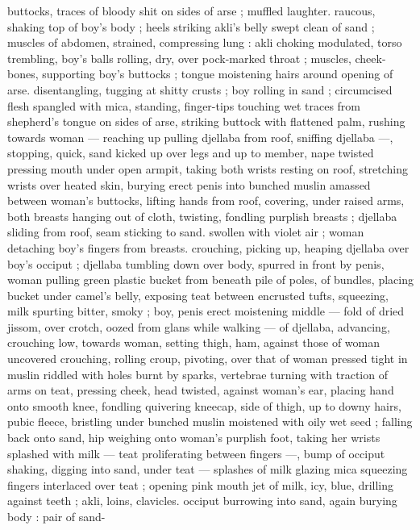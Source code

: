 buttocks, traces of bloody shit on sides of arse ; muffled laughter. 
raucous, shaking top of boy's body ; heels striking akli's belly swept 
clean of sand ; muscles of abdomen, strained, compressing lung : 
akli choking modulated, torso trembling, boy's balls rolling, dry, over 
pock-marked throat ; muscles, cheek-bones, supporting boy's 
buttocks ; tongue moistening hairs around opening of arse. 
disentangling, tugging at shitty crusts ; boy rolling in sand ; 
circumcised flesh spangled with mica, standing, finger-tips touching 
wet traces from shepherd's tongue on sides of arse, striking buttock 
with flattened palm, rushing towards woman --- reaching up pulling 
djellaba from roof, sniffing djellaba ---, stopping, quick, sand kicked 
up over legs and up to member, nape twisted pressing mouth under 
open armpit, taking both wrists resting on roof, stretching wrists over 
heated skin, burying erect penis into bunched muslin amassed 
between woman's buttocks, lifting hands from roof, covering, under 
raised arms, both breasts hanging out of cloth, twisting, fondling 
purplish breasts ; djellaba sliding from roof, seam sticking to sand. 
swollen with violet air ; woman detaching boy's fingers from breasts. 
crouching, picking up, heaping djellaba over boy's occiput ; djellaba 
tumbling down over body, spurred in front by penis, woman pulling 
green plastic bucket from beneath pile of poles, of bundles, placing 
bucket under camel's belly, exposing teat between encrusted tufts, 
squeezing, milk spurting bitter, smoky ; boy, penis erect moistening 
middle --- fold of dried jissom, over crotch, oozed from glans while 
walking --- of djellaba, advancing, crouching low, towards woman, 
setting thigh, ham, against those of woman uncovered crouching, 
rolling croup, pivoting, over that of woman pressed tight in muslin 
riddled with holes burnt by sparks, vertebrae turning with traction of 
arms on teat, pressing cheek, head twisted, against woman's ear, 
placing hand onto smooth knee, fondling quivering kneecap, side of 
thigh, up to downy hairs, pubic fleece, bristling under bunched 
muslin moistened with oily wet seed ; falling back onto sand, hip 
weighing onto woman's purplish foot, taking her wrists splashed with 
milk --- teat proliferating between fingers ---, bump of occiput 
shaking, digging into sand, under teat --- splashes of milk glazing 
mica {\dashcom} squeezing fingers interlaced over teat ; opening pink mouth 
{\col} jet of milk, icy, blue, drilling against teeth ; akli, loins, clavicles. 
occiput burrowing into sand, again burying body : pair of sand- 
